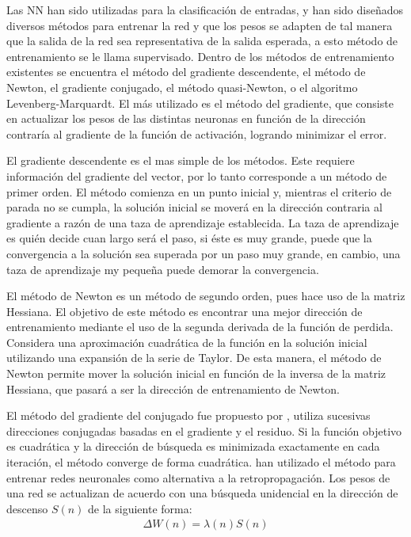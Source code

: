 Las NN han sido utilizadas para la clasificación de entradas, y han sido diseñados diversos métodos para entrenar la red y que los pesos se adapten de tal manera que la salida de la red sea representativa de la salida esperada, a esto método de entrenamiento se le llama supervisado. Dentro de los métodos de entrenamiento existentes se encuentra el método del gradiente descendente, el método de Newton, el gradiente conjugado, el método quasi-Newton, o el algoritmo Levenberg-Marquardt. El más utilizado es el método del gradiente, que consiste en actualizar los pesos de las distintas neuronas en función de la dirección contraría al gradiente de la función de activación, logrando minimizar el error.

El gradiente descendente es el mas simple de los métodos. Este requiere información del gradiente del vector, por lo tanto corresponde a un método de primer orden. El método comienza en un punto inicial y, mientras el criterio de parada no se cumpla, la solución inicial se moverá en la dirección contraria al gradiente a razón de una taza de aprendizaje establecida. La taza de aprendizaje es quién decide cuan largo será el paso, si éste es muy grande, puede que la convergencia a la solución sea superada por un paso muy grande, en cambio, una taza de aprendizaje my pequeña puede demorar la convergencia.

El método de Newton es un método de segundo orden, pues hace uso de la matriz Hessiana. El objetivo de este método es encontrar una mejor dirección de entrenamiento mediante el uso de la segunda derivada de la función de perdida. Considera una aproximación cuadrática de la función en la solución inicial utilizando una expansión de la serie de Taylor. De esta manera, el método de Newton permite mover la solución inicial en función de la inversa de la matriz Hessiana, que pasará a ser la dirección de entrenamiento de Newton.

El método del gradiente del conjugado fue propuesto por , utiliza sucesivas direcciones conjugadas basadas en el gradiente y el residuo. Si la función objetivo es cuadrática y la dirección de búsqueda es minimizada exactamente en cada iteración, el método converge de forma cuadrática.  han utilizado el método para entrenar redes neuronales como alternativa a la retropropagación. Los pesos de una red se actualizan de acuerdo con una búsqueda unidencial en la dirección de descenso $S(n)$ de la siguiente forma:
\begin{eqnarray}
	\Delta W(n) = \lambda(n)S(n)
\end{eqnarray}

